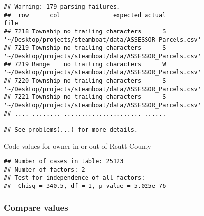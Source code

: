 \documentclass[]{article}
\newenvironment{Shaded}{\begin{snugshade}}{\end{snugshade}}
\newcommand{\DataTypeTok}[1]{\textcolor[rgb]{0.13,0.29,0.53}{#1}}
\newcommand{\DecValTok}[1]{\textcolor[rgb]{0.00,0.00,0.81}{#1}}
\newcommand{\KeywordTok}[1]{\textcolor[rgb]{0.13,0.29,0.53}{\textbf{#1}}}
\newcommand{\NormalTok}[1]{#1}
\newcommand{\OperatorTok}[1]{\textcolor[rgb]{0.81,0.36,0.00}{\textbf{#1}}}
\newcommand{\StringTok}[1]{\textcolor[rgb]{0.31,0.60,0.02}{#1}}
\begin{document}
\begin{verbatim}
## Warning: 179 parsing failures.
##  row      col               expected actual                                                     file
## 7218 Township no trailing characters      S '~/Desktop/projects/steamboat/data/ASSESSOR_Parcels.csv'
## 7219 Township no trailing characters      S '~/Desktop/projects/steamboat/data/ASSESSOR_Parcels.csv'
## 7219 Range    no trailing characters      W '~/Desktop/projects/steamboat/data/ASSESSOR_Parcels.csv'
## 7220 Township no trailing characters      S '~/Desktop/projects/steamboat/data/ASSESSOR_Parcels.csv'
## 7221 Township no trailing characters      S '~/Desktop/projects/steamboat/data/ASSESSOR_Parcels.csv'
## .... ........ ...................... ...... ........................................................
## See problems(...) for more details.
\end{verbatim}

Code values for owner in or out of Routt County

\begin{Shaded}
\end{Shaded}

\begin{verbatim}
## Number of cases in table: 25123 
## Number of factors: 2 
## Test for independence of all factors:
##  Chisq = 340.5, df = 1, p-value = 5.025e-76
\end{verbatim}

\hypertarget{compare-values}{%
\subsubsection{Compare values}\label{compare-values}}
\end{document}
